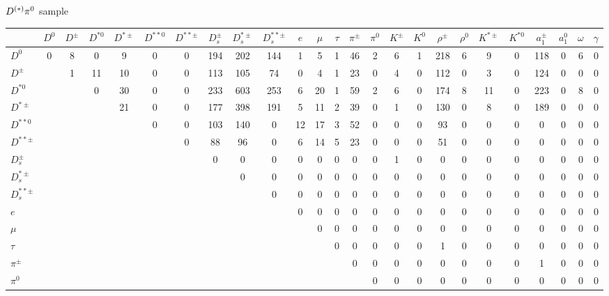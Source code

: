 \documentclass[6pt]{article}
\begin{document}
$D^{(*)}\pi^0$ sample
\begin{landscape} \begin{tabular}{|l||cccc|cc|ccc|ccc|cccc|cccc|cccc|}
\hline
 & $D^0$ & $D^{\pm}$ & $D^{*0}$ & $D^{*\pm}$ & $D^{**0}$ & $D^{**\pm}$ & $D_s^{\pm}$ & $D_s^{*\pm}$ & $D_s^{**\pm}$ & $e$ & $\mu$ & $\tau$ & $\pi^{\pm}$ & $\pi^0$ & $K^{\pm}$ & $K^0$ & $\rho^{\pm}$ & $\rho^0$ & $K^{*\pm}$ & $K^{*0}$ & $a_1^{\pm}$ & $a_1^0$ & $\omega$ & $\gamma$ \\ \hline \hline
$D^0$  & 0 & 8 & 0 & 9 & 0 & 0 & 194 & 202 & 144 & 1 & 5 & 1 & 46 & 2 & 6 & 1 & 218 & 6 & 9 & 0 & 118 & 0 & 6 & 0 \\
$D^{\pm}$  &  & 1 & 11 & 10 & 0 & 0 & 113 & 105 & 74 & 0 & 4 & 1 & 23 & 0 & 4 & 0 & 112 & 0 & 3 & 0 & 124 & 0 & 0 & 0 \\
$D^{*0}$  &  &  & 0 & 30 & 0 & 0 & 233 & 603 & 253 & 6 & 20 & 1 & 59 & 2 & 6 & 0 & 174 & 8 & 11 & 0 & 223 & 0 & 8 & 0 \\
$D^{*\pm}$  &  &  &  & 21 & 0 & 0 & 177 & 398 & 191 & 5 & 11 & 2 & 39 & 0 & 1 & 0 & 130 & 0 & 8 & 0 & 189 & 0 & 0 & 0 \\
\hline 
$D^{**0}$  &  &  &  &  & 0 & 0 & 103 & 140 & 0 & 12 & 17 & 3 & 52 & 0 & 0 & 0 & 93 & 0 & 0 & 0 & 0 & 0 & 0 & 0 \\
$D^{**\pm}$  &  &  &  &  &  & 0 & 88 & 96 & 0 & 6 & 14 & 5 & 23 & 0 & 0 & 0 & 51 & 0 & 0 & 0 & 0 & 0 & 0 & 0 \\
\hline 
$D_s^{\pm}$  &  &  &  &  &  &  & 0 & 0 & 0 & 0 & 0 & 0 & 0 & 0 & 1 & 0 & 0 & 0 & 0 & 0 & 0 & 0 & 0 & 0 \\
$D_s^{*\pm}$  &  &  &  &  &  &  &  & 0 & 0 & 0 & 0 & 0 & 0 & 0 & 0 & 0 & 0 & 0 & 0 & 0 & 0 & 0 & 0 & 0 \\
$D_s^{**\pm}$  &  &  &  &  &  &  &  &  & 0 & 0 & 0 & 0 & 0 & 0 & 0 & 0 & 0 & 0 & 0 & 0 & 0 & 0 & 0 & 0 \\
\hline 
$e$  &  &  &  &  &  &  &  &  &  & 0 & 0 & 0 & 0 & 0 & 0 & 0 & 0 & 0 & 0 & 0 & 0 & 0 & 0 & 0 \\
$\mu$  &  &  &  &  &  &  &  &  &  &  & 0 & 0 & 0 & 0 & 0 & 0 & 0 & 0 & 0 & 0 & 0 & 0 & 0 & 0 \\
$\tau$  &  &  &  &  &  &  &  &  &  &  &  & 0 & 0 & 0 & 0 & 0 & 1 & 0 & 0 & 0 & 0 & 0 & 0 & 0 \\
\hline 
$\pi^{\pm}$  &  &  &  &  &  &  &  &  &  &  &  &  & 0 & 0 & 0 & 0 & 0 & 0 & 0 & 0 & 1 & 0 & 0 & 0 \\
$\pi^0$  &  &  &  &  &  &  &  &  &  &  &  &  &  & 0 & 0 & 0 & 0 & 0 & 0 & 0 & 0 & 0 & 0 & 0 \\

\end{tabular}
\end{landscape}
\end{document}
